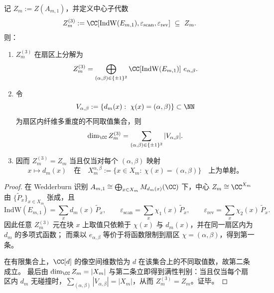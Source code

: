 \begin{proposition}\label{prop:fold-center-resolution-criterion-indw-eps}
记 \(Z_m:=Z(A_{m,1})\)，并定义中心子代数
\[
Z_m^{(3)}:=\CC\!\left[\mathrm{IndW}(E_{m,1}),\varepsilon_{\mathrm{scan}},\varepsilon_{\mathrm{rev}}\right]\ \subseteq\ Z_m.
\]
则：
\begin{enumerate}
\normalfont
  \item \(Z_m^{(3)}\) 在扇区上分解为
  \[
  Z_m^{(3)}
  =
  \bigoplus_{(\alpha,\beta)\in\{\pm1\}^2}\CC\!\left[\mathrm{IndW}(E_{m,1})\right]\,e_{\alpha,\beta}.
  \]
  \item 令
  \[
  V_{\alpha,\beta}:=\{d_m(x):\ \chi(x)=(\alpha,\beta)\}\subset\NN
  \]
  为扇区内纤维多重度的不同取值集合，则
  \[
  \dim_{\CC}Z_m^{(3)}=\sum_{(\alpha,\beta)\in\{\pm1\}^2}|V_{\alpha,\beta}|.
  \]
  \item 因而 \(Z_m^{(3)}=Z_m\) 当且仅当对每个 \((\alpha,\beta)\) 映射
  \[
  x\longmapsto d_m(x)
  \quad\text{在}\quad
  X_m^{\alpha,\beta}:=\{x\in X_m:\ \chi(x)=(\alpha,\beta)\}
  \quad\text{上为单射。}
  \]
\end{enumerate}
\end{proposition}
\begin{proof}
在 Wedderburn 识别 \(A_{m,1}\cong\bigoplus_{x\in X_m}M_{d_m(x)}(\CC)\) 下，中心 \(Z_m\cong\CC^{X_m}\) 由 \(\{\widetilde P_x\}_{x\in X_m}\) 张成，且
\[
\mathrm{IndW}(E_{m,1})=\sum_x d_m(x)\,\widetilde P_x,\qquad
\varepsilon_{\mathrm{scan}}=\sum_x \chi_1(x)\,\widetilde P_x,\qquad
\varepsilon_{\mathrm{rev}}=\sum_x \chi_2(x)\,\widetilde P_x.
\]
因此任意 \(Z_m^{(3)}\) 元在块 \(x\) 上取值只依赖于 \(\chi(x)\) 与 \(d_m(x)\)，并在同一扇区内为 \(d_m\) 的多项式函数；
而乘以 \(e_{\alpha,\beta}\) 等价于将函数限制到扇区 \(\chi=(\alpha,\beta)\)，得到第一条。
\par
在有限集合上，\(\CC[d]\) 的像空间维数恰为 \(d\) 在该集合上的不同取值数，故第二条成立。
最后由 \(\dim_{\CC}Z_m=|X_m|\) 与第二条立即得到满性判别：当且仅当每个扇区内 \(d_m\) 无碰撞时，\(\sum_{(\alpha,\beta)}|V_{\alpha,\beta}|=|X_m|\)，从而 \(Z_m^{(3)}=Z_m\)。证毕。
\end{proof}

